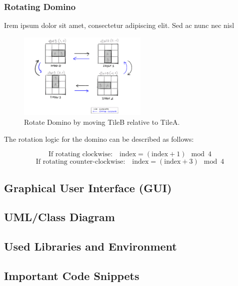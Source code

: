 \documentclass[conference]{IEEEtran}
\begin{document}
\subsubsection{Rotating Domino}

Irem ipsum dolor sit amet, consectetur adipiscing elit. Sed ac nunc nec nisl

\begin{figure}[htbp]
    \centerline{\includegraphics[width=0.55\textwidth]{assets/rotate.png}}
    \caption{Rotate Domino by moving TileB relative to TileA.}\label{fig:rotate}
\end{figure}

The rotation logic for the domino can be described as follows:

\[
    \text{If rotating clockwise:} \quad\boxed{\text{index} = (\text{index} + 1) \mod 4}
\]
\[
    \text{If rotating counter-clockwise:} \quad\boxed{\text{index} = (\text{index} + 3) \mod 4}
\]
\subsection{Graphical User Interface (GUI)}

\subsection{UML/Class Diagram}

\subsection{Used Libraries and Environment}

\subsection{Important Code Snippets}
\end{document}
